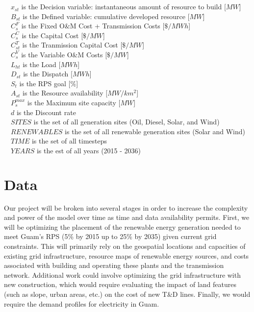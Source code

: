\documentclass[12pt,letterpaper,fleqn]{report}
\begin{document}
  {\setlength{\parindent}{-1em}
    $\quad x_{st}^{}$ is the Decision variable: instantaneous amount of resource to build [$MW$]\\
    $\quad B_{st}^{}$ is the Defined variable: cumulative developed resource [$MW$]\\
    $\quad C_{s}^{F}$ is the Fixed O\&M Cost + Transmission Costs [$\$/MWh$]\\
    $\quad C_{s}^{C}$ is the Capital Cost [$\$/MW$]\\
    $\quad C_{st}^{T}$ is the Tranmission Capital Cost [$\$/MW$]\\
    $\quad C_{s}^{V}$ is the Variable O\&M Costs [$\$/MW$]\\
    $\quad L_{ht}^{}$ is the Load [$MWh$]\\
    $\quad D_{st}^{}$ is the Dispatch [$MWh$]\\
    $\quad S_{t}^{}$ is the RPS goal [$\%$]\\
    $\quad A_{st}^{}$ is the Resource availability [$MW/km^2$]\\
    $\quad P_{s}^{max}$ is the Maximum site capacity [$MW$]\\
    $\quad d$ is the Discount rate\\
    $\quad SITES$ is the set of all generation sites (Oil, Diesel,
    Solar, and Wind)\\
    $\quad RENEWABLES$ is the set of all renewable generation sites
    (Solar and Wind)\\
    $\quad TIME$ is the set of all timesteps\\
    $\quad YEARS$ is the est of all years (2015 - 2036)
  }



\section{Data}

Our project will be broken into several stages in order to increase
the complexity and power of the model over time as time and data
availability permits. First, we will be optimizing the placement of
the renewable energy generation needed to meet Guam’s RPS (5\% by 2015
up to 25\% by 2035) given current grid constraints. This will
primarily rely on the geospatial locations and capacities of existing
grid infrastructure, resource maps of renewable energy sources, and
costs associated with building and operating these plants and the
transmission network. Additional work could involve optimizing the
grid infrastructure with new construction, which would require
evaluating the impact of land features (such as slope, urban areas,
etc.) on the cost of new T\&D lines. Finally, we would require the
demand profiles for electricity in Guam.
\end{document}
